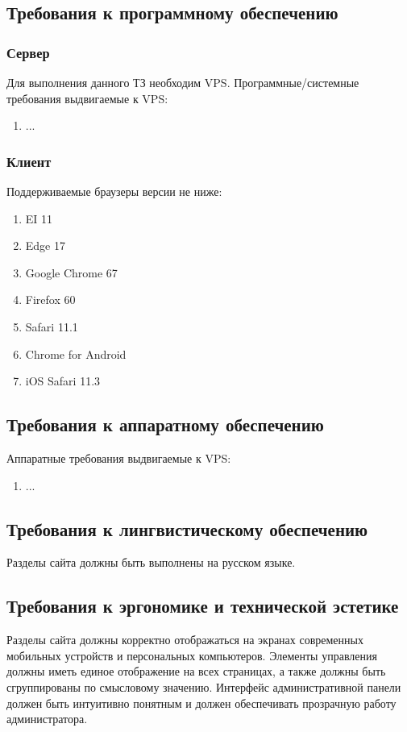 \subsection{Требования к программному обеспечению}
\subsubsection{Сервер}
Для выполнения данного ТЗ необходим VPS. Программные/системные требования выдвигаемые к VPS:
\begin{enumerate}
    \item ...
\end{enumerate}
\subsubsection{Клиент}
Поддерживаемые браузеры версии не ниже:
\begin{enumerate}
    \item EI 11
    \item Edge 17
    \item Google Chrome 67
    \item Firefox 60
    \item Safari 11.1
    \item Chrome for Android
    \item iOS Safari 11.3
\end{enumerate}

\subsection{Требования к аппаратному обеспечению}
Аппаратные требования выдвигаемые к VPS:
\begin{enumerate}
    \item ...
\end{enumerate}

\subsection{Требования к лингвистическому обеспечению}
Разделы сайта должны быть выполнены на русском языке.

\subsection{Требования к эргономике и технической эстетике}
Разделы сайта должны корректно отображаться на экранах современных мобильных устройств и персональных компьютеров.
Элементы управления должны иметь единое отображение на всех страницах, а также должны быть сгруппированы по смысловому значению.
Интерфейс административной панели должен быть интуитивно понятным и должен обеспечивать прозрачную работу администратора.

